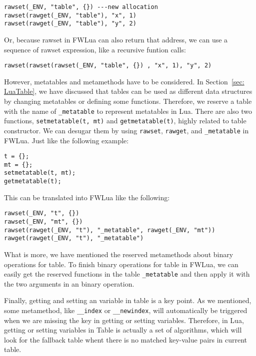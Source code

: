 \begin{verbatim}
rawset(_ENV, "table", {}) ---new allocation
rawset(rawget(_ENV, "table"), "x", 1)
rawset(rawget(_ENV, "table"), "y", 2)
\end{verbatim}

Or, because rawset in FWLua can also return that address, we can use a sequence of rawset expression, like a recursive funtion calls:

\begin{verbatim}
rawset(rawset(rawset(_ENV, "table", {}) , "x", 1), "y", 2)
\end{verbatim}

However, metatables and metamethods have to be considered. In Section~\ref{sec: LuaTable}, we have discussed that tables can be used as different data structures by changing metatables or defining some functions. Therefore, we reserve a table with the name of {\tt \_metatable} to represent metatables in Lua. There are also two functions, {\tt setmetatable(t, mt)} and {\tt getmetatable(t)}, highly related to table constructor. We can desugar them by using {\tt rawset}, {\tt rawget}, and {\tt \_metatable} in FWLua. Just like the following example:

\begin{verbatim}
t = {};
mt = {};
setmetatable(t, mt);
getmetatable(t);
\end{verbatim}

This can be translated into FWLua like the following:

\begin{verbatim}
rawset(_ENV, "t", {})
rawset(_ENV, "mt", {})
rawset(rawget(_ENV, "t"), "_metatable", rawget(_ENV, "mt"))
rawget(rawget(_ENV, "t"), "_metatable")
\end{verbatim}


What is more, we have mentioned the reserved metamethods about binary operations for table. To finish binary operations for table in FWLua, we can easily get the reserved functions in the table {\tt \_metatable} and then apply it with the two arguments in an binary operation.

Finally, getting and setting an variable in table is a key point. As we mentioned, some metamethod, like {\tt \_\_index} or {\tt \_\_newindex}, will automatically be triggered when we are missing the key in getting or setting variables. Therefore, in Lua, getting or setting variables in Table is actually a set of algorithms, which will look for the fallback table whent there is no matched key-value pairs in current table.

